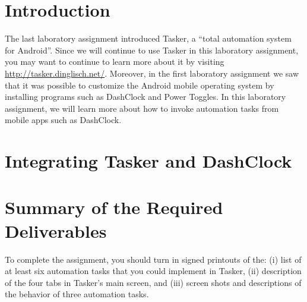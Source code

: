 

\usepackage[compact]{titlesec}



\section*{Introduction}

The last laboratory assignment introduced Tasker, a ``total automation system for Android''.  Since we will continue to
use Tasker in this laboratory assignment, you may want to continue to learn more about it by visiting
\url{http://tasker.dinglisch.net/}. Moreover, in the first laboratory assignment we saw that it was possible to
customize the Android mobile operating system by installing programs such as DashClock and Power Toggles.  In this
laboratory assignment, we will learn more about how to invoke automation tasks from mobile apps such as DashClock.

\section*{Integrating Tasker and DashClock}



\section*{Summary of the Required Deliverables}

To complete the assignment, you should turn in signed printouts of the: (i) list of at least six automation tasks
that you could implement in Tasker, (ii) description of the four tabs in Tasker's main screen, and (iii) screen shots
and descriptions of the behavior of three automation tasks.


